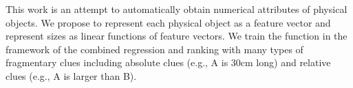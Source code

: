 This work is an attempt to automatically obtain numerical attributes of physical objects. We propose to represent each physical object as a feature vector and represent sizes as linear functions of feature vectors. We train the function in the framework of the combined regression and ranking with many types of fragmentary clues including absolute clues (e.g., A is 30cm long) and relative clues (e.g., A is larger than B).
